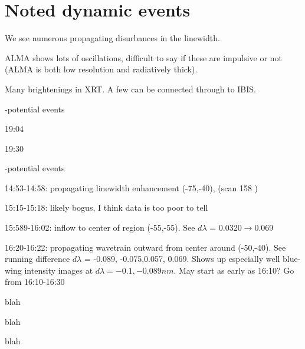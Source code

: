 \section{Noted dynamic events}
We see numerous propagating disurbances in the \halpha{} linewidth.

ALMA shows lots of oscillations, difficult to say if these are impulsive or not (ALMA is both low resolution and radiatively thick). 

Many brightenings in XRT. A few can be connected through to IBIS.
\begin{description}
    {\item[NuSTAR]-potential events}
    \begin{itemize}
        {\item 19:04}
        {\item 19:30}
    \end{itemize}
    {\item[IBIS]-potential events}
        \begin{itemize}
            {\item 14:53-14:58: propagating linewidth enhancement (-75,-40), (scan 158 )}
            {\item 15:15-15:18: likely bogus, I think data is too poor to tell}
            {\item 15:589-16:02: inflow to center of region (-55,-55).  See $d\lambda$ = 0.0320$\rightarrow$0.069}
            {\item 16:20-16:22: propagating wavetrain outward from center around (-50,-40).  See running difference $d\lambda$ = -0.089, -0.075,0.057, 0.069.  Shows up especially well blue-wing intensity images at $d\lambda = -0.1, -0.089\unit{nm}$.  May start as early as 16:10?  Go from 16:10-16:30}
        \end{itemize}
    {\item[XRT] blah}
    {\item[ALMA] blah}
    {\item[IRIS] blah}
\end{description}
